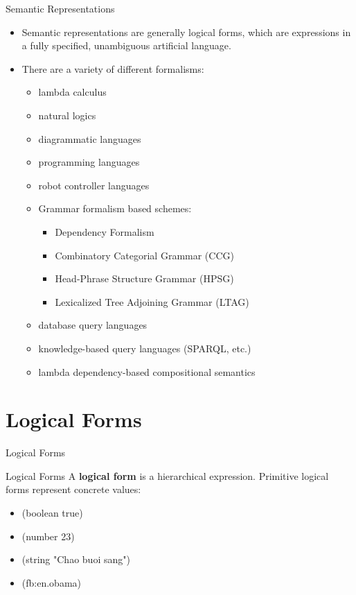 \documentclass{beamer}
\begin{document}
\begin{frame}{Semantic Representations}
    \begin{itemize}
        \item Semantic representations are generally logical forms, which are
expressions in a fully specified, unambiguous artificial language.
        \item There are a variety of different formalisms:
            \begin{itemize}
                \item lambda calculus
                \item natural logics
                \item diagrammatic languages
                \item programming languages
                \item robot controller languages
                \item Grammar formalism based schemes:
                \begin{itemize}
                    \item Dependency Formalism
                    \item Combinatory Categorial Grammar (CCG)
                    \item Head-Phrase Structure Grammar (HPSG)
                    \item Lexicalized Tree Adjoining Grammar (LTAG)
                \end{itemize}
                \item database query languages
                \item knowledge-based query languages (SPARQL, etc.)
                \item lambda dependency-based compositional semantics
            \end{itemize}
    \end{itemize}
\end{frame}

\section{Logical Forms}

\begin{frame}{Logical Forms}
    \begin{block}{Logical Forms}
        A \textbf{logical form} is a hierarchical expression. Primitive logical forms
represent concrete values:
        \begin{itemize}
            \item (boolean true)
            \item (number 23)
            \item (string "Chao buoi sang")
            \item (fb:en.obama)
        \end{itemize}
    \end{block}
\end{frame}
\end{document}
